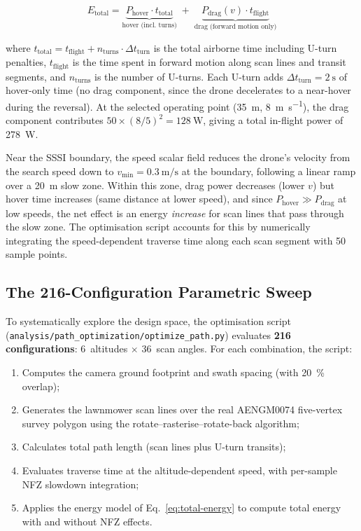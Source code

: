 \begin{equation}\label{eq:total-energy}
  E_{\mathrm{total}} = \underbrace{P_{\mathrm{hover}} \cdot t_{\mathrm{total}}}_{\text{hover (incl.\ turns)}} \;+\; \underbrace{P_{\mathrm{drag}}(v) \cdot t_{\mathrm{flight}}}_{\text{drag (forward motion only)}}
\end{equation}

\noindent where $t_{\mathrm{total}} = t_{\mathrm{flight}} + n_{\mathrm{turns}} \cdot \Delta t_{\mathrm{turn}}$ is the total airborne time including U-turn penalties, $t_{\mathrm{flight}}$ is the time spent in forward motion along scan lines and transit segments, and $n_{\mathrm{turns}}$ is the number of U-turns. Each U-turn adds $\Delta t_{\mathrm{turn}} = \SI{2}{\second}$ of hover-only time (no drag component, since the drone decelerates to a near-hover during the reversal).
At the selected operating point (\SI{35}{\metre}, \SI{8}{\metre\per\second}), the drag component contributes $50 \times (8/5)^2 = \SI{128}{\watt}$, giving a total in-flight power of \SI{278}{\watt}.

Near the SSSI boundary, the speed scalar field reduces the drone's velocity from the search speed down to $v_{\mathrm{min}} = \SI{0.3}{\metre\per\second}$ at the boundary, following a linear ramp over a \SI{20}{\metre} slow zone.
Within this zone, drag power decreases (lower $v$) but hover time increases (same distance at lower speed), and since $P_{\mathrm{hover}} \gg P_{\mathrm{drag}}$ at low speeds, the net effect is an energy \emph{increase} for scan lines that pass through the slow zone.
The optimisation script accounts for this by numerically integrating the speed-dependent traverse time along each scan segment with 50 sample points.

\subsection{The 216-Configuration Parametric Sweep}\label{sec:sweep}

To systematically explore the design space, the optimisation script (\texttt{analysis/path\_optimization/optimize\_path.py}) evaluates \textbf{216 configurations}: 6~altitudes $\times$ 36~scan angles.
For each combination, the script:

\begin{enumerate}
  \item Computes the camera ground footprint and swath spacing (with \SI{20}{\percent} overlap);
  \item Generates the lawnmower scan lines over the real AENGM0074 five-vertex survey polygon using the rotate--rasterise--rotate-back algorithm;
  \item Calculates total path length (scan lines plus U-turn transits);
  \item Evaluates traverse time at the altitude-dependent speed, with per-sample NFZ slowdown integration;
  \item Applies the energy model of Eq.~\eqref{eq:total-energy} to compute total energy with and without NFZ effects.
\end{enumerate}

